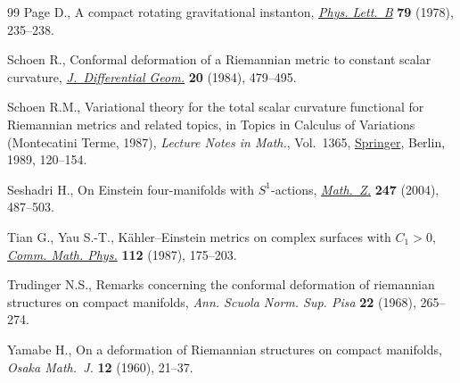\documentclass[10pt,a4paper]{amsart}
\providecommand{\LastPageEnding}{}
\numberwithin{equation}{section}
\begin{document}
\begin{thebibliography}{99}
Page D., A compact rotating gravitational instanton, \href{https://doi.org/10.1016/0370-2693(78)90231-9}{\textit{Phys. Lett.~B}}
 \textbf{79} (1978), 235--238.

Schoen R., Conformal deformation of a {R}iemannian metric to constant scalar
 curvature, \href{https://doi.org/10.4310/jdg/1214439291}{\textit{J.~Differential Geom.}} \textbf{20} (1984), 479--495.

Schoen R.M., Variational theory for the total scalar curvature functional for
 {R}iemannian metrics and related topics, in Topics in Calculus of Variations
 ({M}ontecatini {T}erme, 1987), \textit{Lecture Notes in Math.}, Vol.~1365,
 \href{https://doi.org/10.1007/BFb0089180}{Springer}, Berlin, 1989, 120--154.

Seshadri H., On {E}instein four-manifolds with {$S^1$}-actions,
 \href{https://doi.org/10.1007/s00209-003-0557-4}{\textit{Math.~Z.}} \textbf{247} (2004), 487--503.

Tian G., Yau S.-T., K\"ahler--{E}instein metrics on complex surfaces with
 {$C_1>0$}, \href{https://doi.org/10.1007/BF01217685}{\textit{Comm. Math. Phys.}} \textbf{112} (1987), 175--203.

Trudinger N.S., Remarks concerning the conformal deformation of riemannian
 structures on compact manifolds, \textit{Ann. Scuola Norm. Sup. Pisa}
 \textbf{22} (1968), 265--274.

Yamabe H., On a deformation of {R}iemannian structures on compact manifolds,
 \textit{Osaka Math.~J.} \textbf{12} (1960), 21--37.

\end{thebibliography}\LastPageEnding
\end{document}

